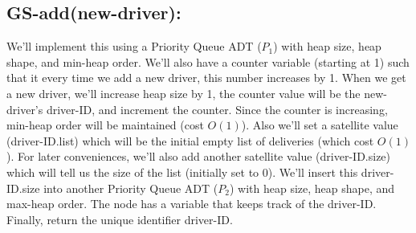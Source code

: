 \documentclass{article}
\begin{document}
\subsection*{GS-add(new-driver):} 
We'll implement this using a Priority Queue ADT ($P_1$) with heap size, heap shape, and min-heap order. We'll also have a counter variable (starting at 1) such that it every time we add a new driver, this number increases by 1. When we get a new driver, we'll increase heap size by 1, the counter value will be the new-driver's driver-ID, and increment the counter. Since the counter is increasing, min-heap order will be maintained (cost $O(1)$). 
Also we'll set a satellite value (driver-ID.list) which will be the initial empty list of deliveries (which cost $O(1)$). For later conveniences, we'll also add another satellite value (driver-ID.size) which will tell us the size of the list (initially set to 0). We'll insert this driver-ID.size into another Priority Queue ADT ($P_2$) with heap size, heap shape, and max-heap order. The node has a variable that keeps track of the driver-ID. Finally, return the unique identifier driver-ID.
\end{document}
